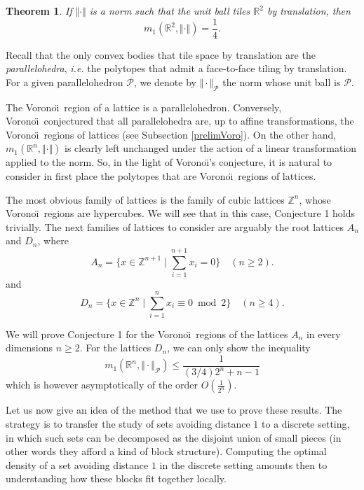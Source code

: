 \documentclass{amsart}                     %
\newtheorem{theo}{Theorem}
\newcommand{\Z}{{\mathbb Z}}
\newcommand{\R}{{\mathbb R}}
\begin{document}
\begin{theo}\label{TheoPlan}
If $\Vert \cdot \Vert$ is a norm such that the unit ball tiles $\R^2$ by translation, then
$$ m_1(\R^2,\Vert \cdot \Vert )= \frac{1}{4}. $$
\end{theo}



Recall that the only convex bodies that tile space by translation are the \textit{parallelohedra}, \textit{i.e.} the polytopes that admit a face-to-face tiling by translation. For a given parallelohedron $\mathcal{P}$, we denote by $\Vert \cdot\Vert  _\mathcal{P}$ the norm whose unit ball is  $\mathcal{P}$.

The Vorono\"\i\  region of a lattice is a parallelohedron. Conversely, Vorono\"\i\  conjectured that all parallelohedra are, up to affine transformations, the Vorono\"\i\  regions of lattices (see Subsection \ref{prelimVoro}). On the other hand, $m_1(\R^n, \Vert\cdot\Vert)$ is clearly left 
unchanged under the action of a linear transformation applied to the
norm. So, in the light of Vorono\"\i's conjecture, it is natural to
consider in first place the polytopes that are Vorono\"\i\ regions of lattices.

The most obvious family of  lattices is the  family of cubic lattices $\Z^n$, whose
Vorono\"\i\ regions are hypercubes. We will see that in this case,
Conjecture 1 holds trivially. The next families of lattices to consider
are arguably the root lattices $A_n$ and $D_n$, where
\begin{equation*}
A_n=\{x\in \Z^{n+1} \mid \sum_{i=1}^{n+1} x_i=0\} \quad (n\geq 2).
\end{equation*}
and 
\begin{equation*}
D_n=\{x\in \Z^n\mid \sum_{i=1}^n x_i\equiv 0\bmod
2\} \quad (n\geq 4).
\end{equation*}

We will prove
Conjecture 1 for the Vorono\"\i\ regions of the lattices $A_n$ in every dimensions $n\geq
2$. 
For the lattices $D_n$, 
we can only show the inequality
$$m_1(\R^n,\Vert   \cdot\Vert  _\mathcal{P})\leq \frac{1}{(3/{4})2^n+n-1}$$
which is however asymptotically of the order $O\left(\frac 1 {2^n}\right)$.




Let us now give an idea of the method that we use to prove these results.
The strategy is to transfer the study of sets avoiding distance $1$ to a discrete setting, in which such
sets can be decomposed as the disjoint union of small pieces (in other
words they afford a kind of block structure). Computing the optimal density of a set avoiding distance $1$ in the
discrete setting amounts then to understanding how these blocks fit
together locally. 
\end{document}
